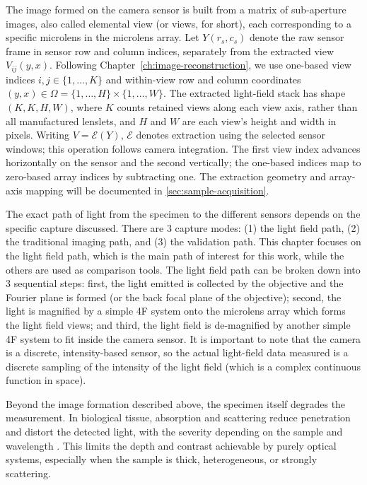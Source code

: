 The image formed on the camera sensor is built from a matrix of sub-aperture images, also called elemental view (or views, for short), each corresponding to a specific microlens in the microlens array.
Let $Y(r_s,c_s)$ denote the raw sensor frame in sensor row and column indices, separately from the extracted view $V_{ij}(y,x)$.
Following Chapter~\ref{ch:image-reconstruction}, we use one-based view indices $i,j\in\{1,\ldots,K\}$ and within-view row and column coordinates $(y,x)\in\Omega=\{1,\ldots,H\}\times\{1,\ldots,W\}$.
The extracted light-field stack has shape $(K,K,H,W)$, where $K$ counts retained views along each view axis, rather than all manufactured lenslets, and $H$ and $W$ are each view's height and width in pixels.
Writing $V=\mathcal E(Y)$, $\mathcal E$ denotes extraction using the selected sensor windows; this operation follows camera integration.
The first view index advances horizontally on the sensor and the second vertically; the one-based indices map to zero-based array indices by subtracting one.
The extraction geometry and array-axis mapping will be documented in \cref{sec:sample-acquisition}.

The exact path of light from the specimen to the different sensors depends on the specific capture discussed.
There are 3 capture modes: (1) the light field path, (2) the traditional imaging path, and (3) the validation path.
This chapter focuses on the light field path, which is the main path of interest for this work, while the others are used as comparison tools.
The light field path can be broken down into 3 sequential steps: first, the light emitted is collected by the objective and the Fourier plane is formed (or the back focal plane of the objective); second, the light is magnified by a simple 4F system onto the microlens array which forms the light field views; and third, the light field is de-magnified by another simple 4F system to fit inside the camera sensor.
It is important to note that the camera is a discrete, intensity-based sensor, so the actual light-field data measured is a discrete sampling of the intensity of the light field (which is a complex continuous function in space).

Beyond the image formation described above, the specimen itself degrades the measurement. In biological tissue, absorption and scattering reduce penetration and distort the detected light, with the severity depending on the sample and wavelength \cite{jacques2013opticalPropertiesTissues}. This limits the depth and contrast achievable by purely optical systems, especially when the sample is thick, heterogeneous, or strongly scattering.



